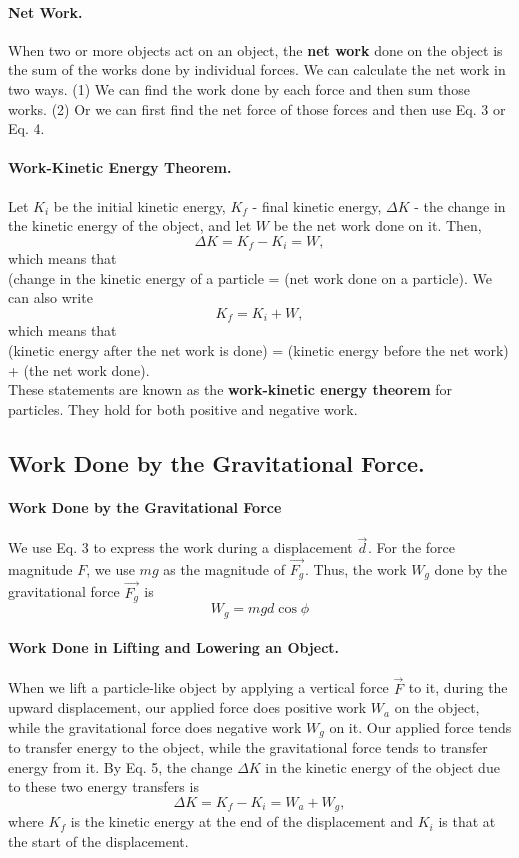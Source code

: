 \documentclass{article}
\begin{document}
\paragraph{Net Work.}When two or more objects act on an object, the \textbf{net work} done on the object is the sum of the works done by individual forces. We can calculate the net work in two ways. (1) We can find the work done by each force and then sum those works. (2) Or we can first find the net force of those forces and then use Eq. 3 or Eq. 4.
\paragraph{Work-Kinetic Energy Theorem.}Let ${K_i}$ be the initial kinetic energy, ${K_f}$ - final kinetic energy, $\Delta K$ - the change in the kinetic energy of the object, and let $W$ be the net work done on it. Then,
\begin{equation}
    \Delta K = K_f - K_i = W,
\end{equation}
which means that\\(change in the kinetic energy of a particle = (net work done on a particle).
We can also write
\begin{equation}
    K_f = K_i + W,
\end{equation}
which means that\\(kinetic energy after the net work is done) = (kinetic energy before the net work) + (the net work done).\\These statements are known as the \textbf{work-kinetic energy theorem} for particles. They hold for both positive and negative work.
\subsection{Work Done by the Gravitational Force.}
\paragraph{Work Done by the Gravitational Force}We use Eq. 3 to express the work during a displacement $\vec{d}^{}$. For the force magnitude $F$, we use $mg$ as the magnitude of $\vec{F_g}^{}$. Thus, the work $W_g$ done by the gravitational force $\vec{F_g}^{}$ is
\begin{equation}
    W_g = mgd\cos \phi
\end{equation}
\paragraph{Work Done in Lifting and Lowering an Object.} When we lift a particle-like object by applying a vertical force $\vec{F}^{}$ to it, during the upward displacement, our applied force does positive work $W_a$ on the object, while the gravitational force does negative work $W_g$ on it. Our applied force tends to transfer energy to the object, while the gravitational force tends to transfer energy from it. By Eq. 5, the change $\Delta K$ in the kinetic energy of the object due to these two energy transfers is
\begin{equation}
    \Delta K = K_f - K_i = W_a + W_g,
\end{equation}
where $K_f$ is the kinetic energy at the end of the displacement and $K_i$ is that at the start of the displacement.
\end{document}
